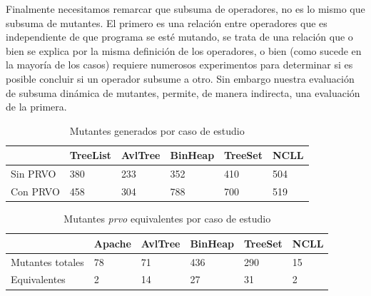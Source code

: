 Finalmente necesitamos remarcar que subsuma de operadores, no es lo mismo que subsuma de mutantes. El primero es una relaci\'on entre operadores que es independiente de que programa se est\'e mutando, se trata de una relaci\'on que o bien se explica por la misma definici\'on de los operadores, o bien (como sucede en la mayor\'ia de los casos) requiere numerosos experimentos para determinar si es posible concluir si un operador subsume a otro. Sin embargo nuestra evaluaci\'on de subsuma din\'amica de mutantes, permite, de manera indirecta, una evaluaci\'on de la primera.

\begin{table}[]
	\caption{Mutantes generados por caso de estudio}
	\label{tables.results.mutants}
	\centering
	\begin{tabular}{@{}l|lllll|@{}}
		\cmidrule(l){2-6}
		& TreeList & AvlTree & BinHeap & TreeSet & NCLL \\ \midrule
		\multicolumn{1}{|l|}{Sin PRVO} & 380 & 233 & 352 & 410 & 504 \\ \cmidrule(r){1-1}
		\multicolumn{1}{|l|}{Con PRVO} & 458 & 304 & 788 & 700 & 519 \\ \bottomrule
	\end{tabular}
\end{table}

\begin{table}[]
	\caption{Mutantes \emph{prvo} equivalentes por caso de estudio}
	\label{tables.results.equivalents}
	\centering
	\begin{tabular}{@{}l|lllll|@{}}
		\cmidrule(l){2-6}
		& Apache & AvlTree & BinHeap & TreeSet & NCLL \\ \midrule
		\multicolumn{1}{|l|}{Mutantes totales} & 78 & 71 & 436 & 290 & 15 \\ \cmidrule(r){1-1}
		\multicolumn{1}{|l|}{Equivalentes} & 2 & 14 & 27 & 31 & 2 \\ \bottomrule
	\end{tabular}
\end{table}

